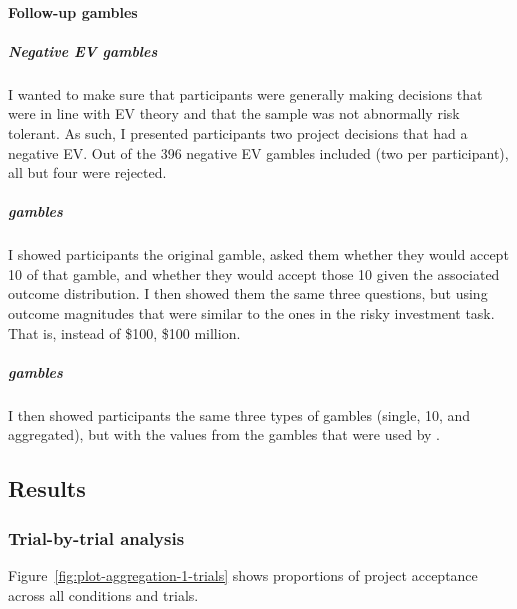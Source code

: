 \documentclass[a4paper, nobind, dvipsnames]{templates/ociamthesis}
\theoremstyle{definition}
\theoremstyle{definition}
\theoremstyle{definition}
\theoremstyle{definition}
\theoremstyle{remark}
\begin{document}
\hypertarget{follow-up-materials-aggregation-1-appendix}{%
\paragraph{Follow-up gambles}\label{follow-up-materials-aggregation-1-appendix}}

\hypertarget{negative-ev-gambles}{%
\subparagraph{Negative EV gambles}\label{negative-ev-gambles}}

I wanted to make sure that participants were generally making decisions that
were in line with EV theory and that the sample was not abnormally risk
tolerant. As such, I presented participants two project decisions that had a
negative EV. Out of the 396 negative EV
gambles included (two per participant), all but
four were rejected.

\hypertarget{samuelson1963-gambles}{%
\subparagraph{\texorpdfstring{\textcite{samuelson1963} gambles}{Samuelson (1963) gambles}}\label{samuelson1963-gambles}}

I showed participants the original \textcite{samuelson1963} gamble, asked them whether
they would accept 10 of that gamble, and whether they would accept those 10
given the associated outcome distribution. I then showed them the same three
questions, but using outcome magnitudes that were similar to the ones in the
risky investment task. That is, instead of \$100, \$100 million.

\hypertarget{redelmeier1992-gambles}{%
\subparagraph{\texorpdfstring{\textcite{redelmeier1992} gambles}{Redelmeier \& Tversky (1992) gambles}}\label{redelmeier1992-gambles}}

I then showed participants the same three types of gambles (single, 10, and
aggregated), but with the values from the gambles that were used by
\textcite{redelmeier1992}.

\hypertarget{results-aggregation-1-appendix}{%
\subsection{Results}\label{results-aggregation-1-appendix}}

\hypertarget{trial-by-trial-aggregation-1}{%
\subsubsection{Trial-by-trial analysis}\label{trial-by-trial-aggregation-1}}

Figure~\ref{fig:plot-aggregation-1-trials} shows proportions of project
acceptance across all conditions and trials.
\end{document}
